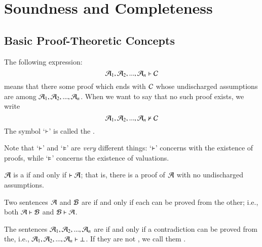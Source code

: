 \documentclass[12pt, a4paper, twoside, openright, titlepage]{book}
\begin{document}
\chapter{\textsection\textsection Soundness and Completeness}

\section{\textsection Basic Proof-Theoretic Concepts}

\begin{defn}{}{}
    The following expression: \begin{equation*}
        \mathcal{A}_1,\mathcal{A}_2,...,\mathcal{A}_n\vdash\mathcal{C}
    \end{equation*}
    means that there  some proof which ends with $\mathcal{C}$ whose undischarged assumptions are among $\mathcal{A}_1,\mathcal{A}_2,...,\mathcal{A}_n$. When we want to say that no such proof exists, we write \begin{equation*}
        \mathcal{A}_1,\mathcal{A}_2,...,\mathcal{A}_n\nvdash\mathcal{C}
    \end{equation*}
    The symbol `$\vdash$' is called the .
\end{defn}

\begin{rmk}{}{}
    Note that `$\vdash$' and `$\vDash$' are \emph{very} different things: `$\vdash$' concerns with the existence of proofs, while `$\vDash$' concerns the existence of valuations.
\end{rmk}

\begin{defn}{}{}
    $\mathcal{A}$ is a  if and only if $\vdash \mathcal{A}$; that is, there is a proof of $\mathcal{A}$ with no undischarged assumptions.
\end{defn}


\begin{defn}{}{}
    Two sentences $\mathcal{A}$ and $\mathcal{B}$ are  if and only if each can be proved from the other; i.e., both $\mathcal{A} \vdash \mathcal{B}$ and $\mathcal{B}\vdash\mathcal{A}$.
\end{defn}

\begin{defn}{}{}
    The sentences $\mathcal{A}_1,\mathcal{A}_2,...,\mathcal{A}_n$ are  if and only if a contradiction can be proved from the, i.e., $\mathcal{A}_1,\mathcal{A}_2,...,\mathcal{A}_n\vdash\bot$. If they are not , we call them .
\end{defn}
\end{document}
